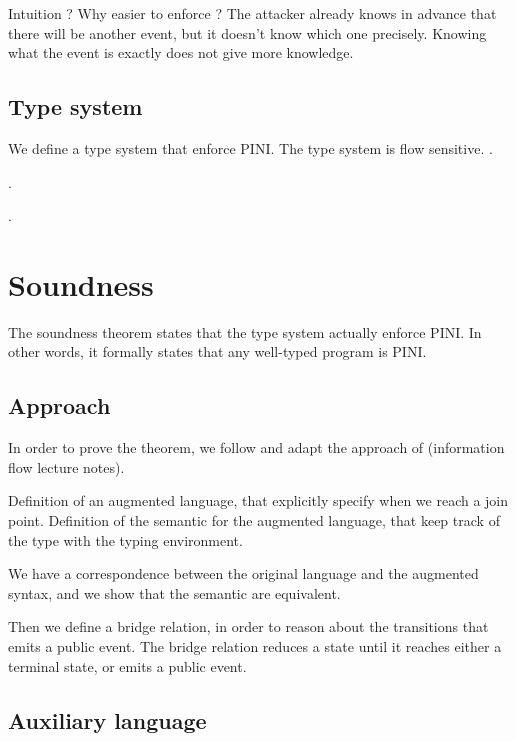 \documentclass[10pt]{article}
\begin{document}
Intuition ? Why easier to enforce ?
The attacker already knows in advance that there will be another event, but it doesn't know which
one precisely. Knowing what the event is exactly does not give more knowledge.

\subsection{Type system}%
\label{subsec:type_system}

We define a type system that enforce PINI.
The type system is flow sensitive.
.

.

.

\section{Soundness}%
\label{sec:soundness}

The soundness theorem states that the type system actually enforce PINI. In other words, it formally
states that any well-typed program is PINI.


\subsection{Approach}%
\label{subsec:approach}

In order to prove the theorem, we follow and adapt the approach of (information flow lecture notes).

Definition of an augmented language, that explicitly specify when we reach a join point. Definition
of the semantic for the augmented language, that keep track of the type with the typing environment.

We have a correspondence between the original language and the augmented syntax, and we show that
the semantic are equivalent.

Then we define a bridge relation, in order to reason about the transitions that emits a public
event.
The bridge relation reduces a state until it reaches either a terminal state, or emits a public
event.

\subsection{Auxiliary language}%
\label{subsec:aux_lang}
\end{document}
